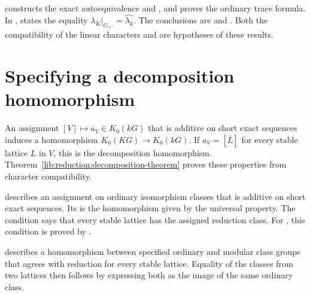 \begin{implementation}
 constructs the exact
autoequivalence and , and proves the
ordinary trace formula. In
,
 states the equality
$\lambda_K\big|_{G_{\ell'}}=\widehat{\lambda_k}$. The conclusions are
 and
.
Both the compatibility of the linear characters and
 are hypotheses of these results.
\end{implementation}

\section{Specifying a decomposition homomorphism}
\label{lib:reduction:interfaces}

An assignment $[V]\mapsto a_V\in K_0(kG)$ that is additive on short
exact sequences induces a homomorphism $K_0(KG)\to K_0(kG)$. If
$a_V=[\overline L]$ for every stable lattice $L$ in $V$, this is the
decomposition homomorphism.
Theorem~\ref{lib:reduction:decomposition-theorem} proves these properties
from character compatibility.

\begin{implementation}
 describes an assignment on ordinary
isomorphism classes that is additive on short exact sequences. Its
 is the homomorphism given by the universal property.
The condition  says that every
stable lattice has the assigned reduction class. For
, this condition is proved by
.

 describes a homomorphism between
specified ordinary and modular class groups that agrees with reduction
for every stable lattice. Equality of the classes from
two lattices then follows by expressing both as the image of the same
ordinary class.
\end{implementation}
